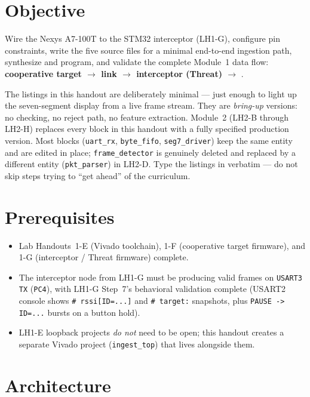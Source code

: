 \documentclass[11pt,letterpaper]{article}
\begin{document}

\section{Objective}
Wire the Nexys A7-100T to the STM32 interceptor (LH1-G), configure pin constraints, write the five \VHDL{} source files for a minimal end-to-end ingestion path, synthesize and program, and validate the complete Module~1 data flow: \textbf{cooperative target $\to$ \RF{} link $\to$ interceptor (Threat) $\to$ \FPGA{}}.

\begin{tcolorbox}[infobox={Scope of the \VHDL{} you write here}]
The \VHDL{} listings in this handout are deliberately minimal --- just enough to light up the seven-segment display from a live frame stream. They are \emph{bring-up} versions: no \CRC{} checking, no reject path, no feature extraction. Module~2 (LH2-B through LH2-H) replaces every block in this handout with a fully specified production version. Most blocks (\texttt{uart\_rx}, \texttt{byte\_fifo}, \texttt{seg7\_driver}) keep the same entity and are edited in place; \texttt{frame\_detector} is genuinely deleted and replaced by a different entity (\texttt{pkt\_parser}) in LH2-D. Type the listings in verbatim --- do not skip steps trying to ``get ahead'' of the curriculum.
\end{tcolorbox}

\section{Prerequisites}
\begin{itemize}[leftmargin=2em]
	\item Lab Handouts~1-E (Vivado toolchain), 1-F (cooperative target firmware), and 1-G (interceptor / Threat firmware) complete.
	\item The interceptor node from LH1-G must be producing valid frames on \texttt{USART3 TX} (\texttt{PC4}), with LH1-G Step~7's behavioral validation complete (USART2 console shows \texttt{\#~rssi[ID=...]} and \texttt{\#~target:} snapshots, plus \texttt{PAUSE -> ID=...} bursts on a button hold).
	\item LH1-E loopback projects \emph{do not} need to be open; this handout creates a separate Vivado project (\texttt{ingest\_top}) that lives alongside them.
\end{itemize}

\newpage
\section{Architecture}
\end{document}
